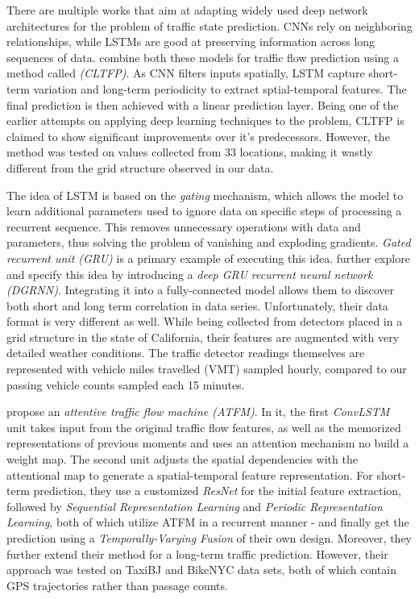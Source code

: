 There are multiple works that aim at adapting widely used deep network
architectures for the problem of traffic state prediction. CNNs rely on
neighboring relationships, while LSTMs are good at preserving information across
long sequences of data. \citet{Yuankai.2016} combine both these models for
traffic flow prediction using a method called \textit{(CLTFP)}. As CNN filters
inputs spatially, LSTM capture short-term variation and long-term periodicity to
extract sptial-temporal features. The final prediction is then achieved with a
linear prediction layer. Being one of the earlier attempts on applying deep
learning techniques to the problem, CLTFP is claimed to show significant
improvements over it's predecessors. However, the method was tested on values
collected from 33 locations, making it wastly different from the grid structure
observed in our data.

The idea of LSTM is based on the \textit{gating} mechanism, which allows the
model to learn additional parameters used to ignore data on specific steps of
processing a recurrent sequence. This removes unnecessary operations with data
and parameters, thus solving the problem of vanishing and exploding gradients.
\textit{Gated recurrent unit (GRU)} \cite{Chung.2014} is a primary example of
executing this idea. \citet{Zhang.2018} further explore and specify this idea by
introducing a \textit{deep GRU recurrent neural network (DGRNN)}. Integrating it
into a fully-connected model allows them to discover both short and long term
correlation in data series. Unfortunately, their data format is very different
as well. While being collected from detectors placed in a grid structure in the
state of California, their features are augmented with very detailed weather
conditions. The traffic detector readings themselves are represented with
vehicle miles travelled (VMT) sampled hourly, compared to our passing vehicle
counts sampled each 15 minutes.

\citet{Liu.2019} propose an \textit{attentive traffic flow machine (ATFM)}. In
it, the first \textit{ConvLSTM} \cite{Shi.2015} unit takes input from the
original traffic flow features, as well as the memorized representations of
previous moments and uses an attention mechanism no build a weight map. The
second unit adjusts the spatial dependencies with the attentional map to
generate a spatial-temporal feature representation. For short-term prediction,
they use a customized \textit{ResNet} \cite{He.2016} for the initial feature
extraction, followed by \textit{Sequential Representation Learning} and
\textit{Periodic Representation Learning}, both of which utilize ATFM in a
recurrent manner - and finally get the prediction using a
\textit{Temporally-Varying Fusion} of their own design. Moreover, they further
extend their method for a long-term traffic prediction. However, their approach
was tested on TaxiBJ \cite{Zhang.2017} and BikeNYC \cite{Zhang.2016} data sets,
both of which contain GPS trajectories rather than passage counts.

